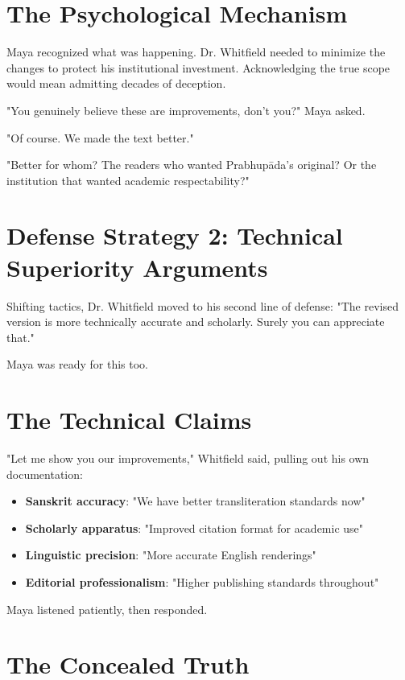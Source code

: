 \documentclass[11pt,twoside]{book}
\begin{document}
\section*{The Psychological Mechanism}
\label{sec:org09f6d77}

Maya recognized what was happening. Dr. Whitfield needed to minimize the changes to protect his institutional investment. Acknowledging the true scope would mean admitting decades of deception.

"You genuinely believe these are improvements, don't you?" Maya asked.

"Of course. We made the text better."

"Better for whom? The readers who wanted Prabhupāda's original? Or the institution that wanted academic respectability?"
\section*{Defense Strategy 2: Technical Superiority Arguments}
\label{sec:orgddab152}

Shifting tactics, Dr. Whitfield moved to his second line of defense: "The revised version is more technically accurate and scholarly. Surely you can appreciate that."

Maya was ready for this too.
\section*{The Technical Claims}
\label{sec:org0d5032d}

"Let me show you our improvements," Whitfield said, pulling out his own documentation:

\begin{itemize}
\item \textbf{\textbf{Sanskrit accuracy}}: "We have better transliteration standards now"
\item \textbf{\textbf{Scholarly apparatus}}: "Improved citation format for academic use"
\item \textbf{\textbf{Linguistic precision}}: "More accurate English renderings"
\item \textbf{\textbf{Editorial professionalism}}: "Higher publishing standards throughout"
\end{itemize}

Maya listened patiently, then responded.
\section*{The Concealed Truth}
\label{sec:orgc683018}
\end{document}
